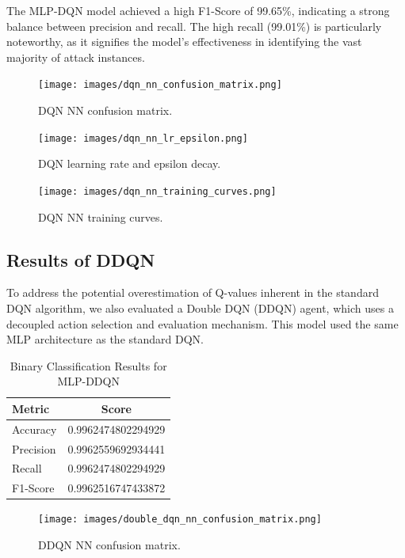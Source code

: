 \documentclass[16pt]{report}
\begin{document}
The MLP-DQN model achieved a high F1-Score of 99.65\%, indicating a strong balance between precision and recall. The high recall (99.01\%) is particularly noteworthy, as it signifies the model's effectiveness in identifying the vast majority of attack instances.
\begin{figure}[htbp]
    \centering
    \texttt{[image: images/dqn\_nn\_confusion\_matrix.png]}
    \caption{DQN NN confusion matrix.}
    \label{fig:dqn_confusion}
\end{figure}

\vspace{0.5cm}

\begin{figure}[htbp]
    \centering
    \texttt{[image: images/dqn\_nn\_lr\_epsilon.png]}
    \caption{DQN learning rate and epsilon decay.}
    \label{fig:dqn_lr_epsilon}
\end{figure}

\vspace{0.5cm}

\begin{figure}[htbp]
    \centering
    \texttt{[image: images/dqn\_nn\_training\_curves.png]}
    \caption{DQN NN training curves.}
    \label{fig:dqn_training_curves}
\end{figure}


\subsection{Results of DDQN}
To address the potential overestimation of Q-values inherent in the standard DQN algorithm, we also evaluated a Double DQN (DDQN) agent, which uses a decoupled action selection and evaluation mechanism. This model used the same MLP architecture as the standard DQN.

\begin{table}[H]
    \centering
    \caption{Binary Classification Results for MLP-DDQN}
    \label{tab:binary_ddqn_results}
    \begin{tabular}{@{}lc@{}}
        \toprule
        \textbf{Metric} & \textbf{Score} \\
        \midrule
        Accuracy & 0.9962474802294929 \\
        Precision & 0.9962559692934441 \\
        Recall & 0.9962474802294929 \\
        F1-Score & 0.9962516747433872 \\
        \bottomrule
    \end{tabular}
\end{table}
\begin{figure}[htbp]
    \centering
    \texttt{[image: images/double\_dqn\_nn\_confusion\_matrix.png]}
    \caption{DDQN NN confusion matrix.}
    \label{fig:ddqn_confusion}
\end{figure}
\end{document}
